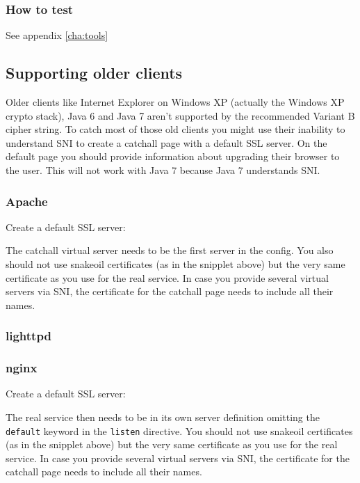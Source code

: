 

\subsubsection{How to test}
See appendix \ref{cha:tools}

\subsection{Supporting older clients}
\gdef\currentsectionname{Webservers-legacy}

Older clients like Internet Explorer on Windows XP (actually the Windows XP
crypto stack), Java 6 and Java 7 aren't supported by the recommended Variant B
cipher string.
To catch most of those old clients you might use their inability to understand
SNI to create a catchall page with a default SSL server. On the default page
you should provide information about upgrading their browser to the user.
This will not work with Java 7 because Java 7 understands SNI.

\subsubsection{Apache}
\gdef\currentsubsectionname{Apache}

Create a default SSL server:


The catchall virtual server needs to be the first server in the config.
You also should not use snakeoil certificates (as in the snipplet above)
but the very same certificate as you use for the real service. In case you
provide several virtual servers via SNI, the certificate for the catchall page
needs to include all their names.

\subsubsection{lighttpd}
\gdef\currentsubsectionname{lighttpd}


\subsubsection{nginx}
\gdef\currentsubsectionname{nginx}

Create a default SSL server:

The real service then needs to be in its own server definition omitting the
\texttt{default} keyword in the \texttt{listen} directive.
You should not use snakeoil certificates (as in the snipplet above) but the
very same certificate as you use for the real service. In case you provide
several virtual servers via SNI, the certificate for the catchall page needs
to include all their names.

